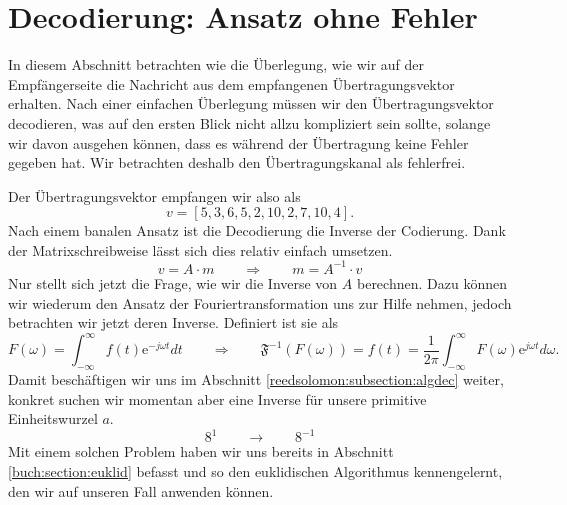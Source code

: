 %
%
%
\section{Decodierung: Ansatz ohne Fehler
\label{reedsolomon:section:decohnefehler}}

In diesem Abschnitt betrachten wie die Überlegung, wie wir auf der Empfängerseite die Nachricht aus dem empfangenen Übertragungsvektor erhalten. Nach einer einfachen Überlegung müssen wir den Übertragungsvektor decodieren, was auf den ersten Blick nicht allzu kompliziert sein sollte, solange wir davon ausgehen können, dass es während der Übertragung keine Fehler gegeben hat. Wir betrachten deshalb den Übertragungskanal als fehlerfrei.

Der Übertragungsvektor empfangen wir also als
\[
v = [5,3,6,5,2,10,2,7,10,4].
\]
Nach einem banalen Ansatz ist die Decodierung die Inverse der Codierung. Dank der Matrixschreibweise lässt sich dies relativ einfach umsetzen.
\[
v = A \cdot m \qquad \Rightarrow \qquad m = A^{-1} \cdot v
\]
Nur stellt sich jetzt die Frage, wie wir die Inverse von $A$ berechnen.
Dazu können wir wiederum den Ansatz der Fouriertransformation uns zur Hilfe nehmen,
jedoch betrachten wir jetzt deren Inverse.
Definiert ist sie als
\[
F(\omega) = \int_{-\infty}^{\infty} f(t) \mathrm{e}^{-j\omega t} dt \qquad \Rightarrow \qquad \mathfrak{F}^{-1}(F(\omega)) = f(t) = \frac{1}{2 \pi} \int_{-\infty}^{\infty} F(\omega) \mathrm{e}^{j \omega t} d\omega.
\]
Damit beschäftigen wir uns im Abschnitt \ref{reedsolomon:subsection:algdec} weiter, konkret suchen wir momentan aber eine Inverse für unsere primitive Einheitswurzel $a$. 
\[
8^1 \qquad \rightarrow \qquad 8^{-1}
\]
Mit einem solchen Problem haben wir uns bereits in Abschnitt \ref{buch:section:euklid} befasst und so den euklidischen Algorithmus kennengelernt, den wir auf unseren Fall anwenden können.


